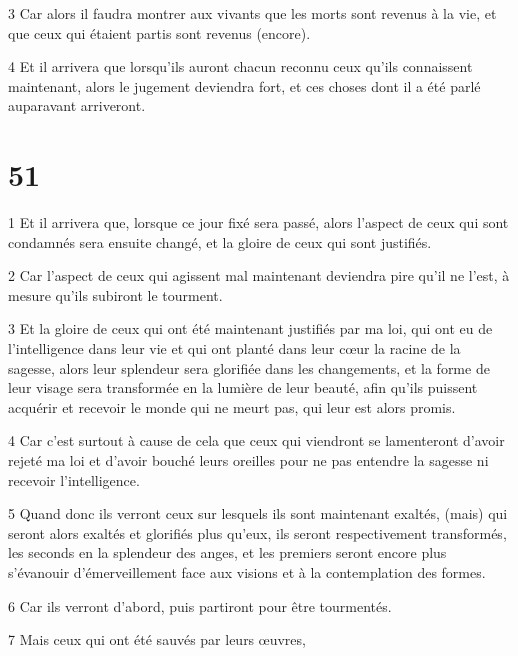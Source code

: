\par 3 Car alors il faudra montrer aux vivants que les morts sont revenus à la vie, et que ceux qui étaient partis sont revenus (encore).

\par 4 Et il arrivera que lorsqu'ils auront chacun reconnu ceux qu'ils connaissent maintenant, alors le jugement deviendra fort, et ces choses dont il a été parlé auparavant arriveront.

\chapter{51}

\par 1 Et il arrivera que, lorsque ce jour fixé sera passé, alors l'aspect de ceux qui sont condamnés sera ensuite changé, et la gloire de ceux qui sont justifiés.

\par 2 Car l'aspect de ceux qui agissent mal maintenant deviendra pire qu'il ne l'est, à mesure qu'ils subiront le tourment.

\par 3 Et la gloire de ceux qui ont été maintenant justifiés par ma loi, qui ont eu de l'intelligence dans leur vie et qui ont planté dans leur cœur la racine de la sagesse, alors leur splendeur sera glorifiée dans les changements, et la forme de leur visage sera transformée en la lumière de leur beauté, afin qu'ils puissent acquérir et recevoir le monde qui ne meurt pas, qui leur est alors promis.

\par 4 Car c'est surtout à cause de cela que ceux qui viendront se lamenteront d'avoir rejeté ma loi et d'avoir bouché leurs oreilles pour ne pas entendre la sagesse ni recevoir l'intelligence.

\par 5 Quand donc ils verront ceux sur lesquels ils sont maintenant exaltés, (mais) qui seront alors exaltés et glorifiés plus qu'eux, ils seront respectivement transformés, les seconds en la splendeur des anges, et les premiers seront encore plus s'évanouir d'émerveillement face aux visions et à la contemplation des formes.

\par 6 Car ils verront d'abord, puis partiront pour être tourmentés.

\par 7 Mais ceux qui ont été sauvés par leurs œuvres,

